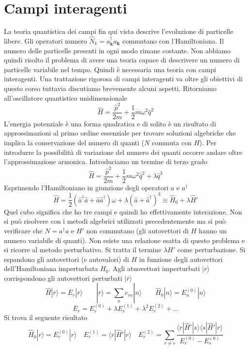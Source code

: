 \section{Campi interagenti}
La teoria quantistica dei campi fin qui vista descrive l'evoluzione di particelle libere. Gli operatori numero $\hat{N}_k=a_\mathbf{k}^\dagger a_\mathbf{k}$ commutano con l'Hamiltoniana. Il numero delle particelle presenti in ogni modo rimane costante. Non abbiamo quindi risolto il problema di avere una teoria capace di descrivere un numero di particelle variabile nel tempo. Quindi è necessaria una teoria con campi interagenti. Una trattazione rigorosa di campi interagenti va oltre gli obiettivi di questo corso tuttavia discutiamo brevemente alcuni aspetti. Ritorniamo all'oscillatore quantistico unidimensionale
$$
\hat{H}=\frac{\hat{p}^2}{2m}+\frac{1}{2}m\omega^2\hat{q}^2
$$
L'energia potenziale è una forma quadratica e di solito è un risultato di approssimazioni al primo ordine essenziale per trovare soluzioni algebriche che implica la conservazione del numero di quanti ($N$ commuta con $H$). Per introdurre la possibilità di variazione del numero dei quanti occorre andare oltre l'approssimazione armonica. Introduciamo un termine di terzo grado
$$
\hat{H} = \frac{\hat{p}^2}{2m} + \frac{1}{2}m\omega^2\hat{q}^2 + \lambda\hat{q}^3
$$
Esprimendo l'Hamiltoniano in giunzione degli operatori $a$ e $a^\dagger$
$$
\hat{H} = \frac{1}{2}(\hat{a}^\dagger\hat{a} + \hat{a}\hat{a}^\dagger)\omega + \lambda(\hat{a} + \hat{a}^\dagger)^3 \equiv \hat{H}_0 + \lambda\hat{H}'
$$
Quel cubo significa che ho tre campi e quindi ho effettivamente interazione. Non si può risolvere con i metodi algebrici utilizzati precedentemente ma si può verificare che $N=a^\dagger a$ e $H'$ non commutano (gli autovettori di $H$ hanno un numero variabile di quanti). Non esiste una relazione esatta di questo problema e si ricorre al metodo perturbativo. Si tratta il termine $\lambda H'$ come perturbazione. Si espandono gli autovettori (e autovalori) di $H$ in funzione degli autovettori dell'Hamiltoniana imperturbata $H_0$. Agli atuovettori imperturbati $|r\rangle$ corrispondono gli autovettori perturbati $|\overline{r}\rangle$
$$
\hat{H}|\overline{r}\rangle = \overline{E}_r |\overline{r}\rangle \qquad |\overline{r}\rangle = \sum_n c_{rn} |n\rangle \qquad \hat{H}_0 |n\rangle = E_n^{(0)} |n\rangle
$$
$$
\overline{E}_r = E_r^{(0)} + \lambda E_r^{(1)} + \lambda^2 E_r^{(2)} + \dots
$$
Si trova il seguente risultato
$$
\hat{H}_0 |r\rangle = E_r^{(0)} |r\rangle \quad E_r^{(1)} = \langle r | \hat{H}' | r \rangle \quad E_r^{(2)} = \sum_{r \neq s} \frac{\langle r | \hat{H}' | s \rangle \langle s | \hat{H}' | r \rangle}{E_r^{(0)} - E_s^{(0)}}
$$
